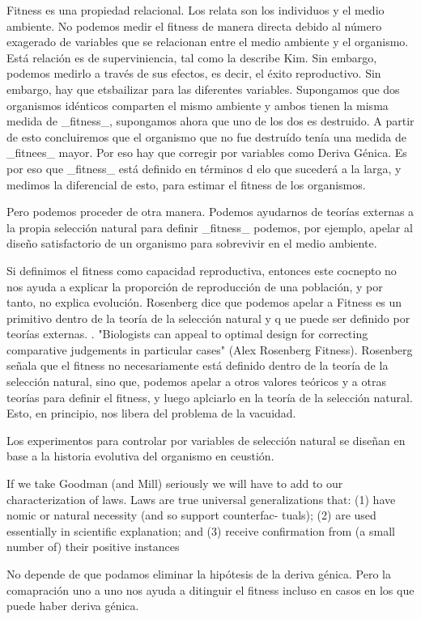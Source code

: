 Fitness es una propiedad relacional. Los relata son los individuos y el medio ambiente. No podemos medir el fitness de manera directa debido al número exagerado de variables que se relacionan entre el medio ambiente y el organismo. Está relación es de superviniencia, tal como la describe Kim. Sin embargo, podemos medirlo a través de sus efectos, es decir, el éxito reproductivo. Sin embargo, hay que etsbailizar para las diferentes variables. Supongamos que dos organismos idénticos comparten el mismo ambiente y ambos tienen la misma medida de _fitness_, supongamos ahora que uno de los dos es destruido. A partir de esto concluiremos que el organismo que no fue destruído tenía una medida de _fitnees_ mayor. Por eso hay que corregir por variables como Deriva Génica. Es por eso que _fitness_ está definido en términos d elo que sucederá a la larga, y medimos la diferencial de esto, para estimar el fitness de los organismos.

Pero podemos proceder de otra manera. Podemos ayudarnos de teorías externas a la propia selección natural para definir _fitness_ podemos, por ejemplo, apelar al diseño satisfactorio de un organismo para sobrevivir en el medio ambiente.

Si definimos el fitness como capacidad reproductiva, entonces este cocnepto no nos ayuda a explicar la proporción de reproducción de una población, y por tanto, no explica evolución. Rosenberg dice que podemos apelar a Fitness es un primitivo dentro de la teoría de la selección natural y q  ue puede ser definido por teorías externas. . "Biologists can appeal to optimal design for correcting comparative judgements in particular cases" (Alex Rosenberg Fitness). Rosenberg señala que el fitness no necesariamente está definido dentro de la teoría de la selección natural, sino que, podemos apelar a otros valores teóricos y a otras teorías para definir el fitness, y luego aplciarlo en la teoría de la selección natural. Esto, en principio, nos libera del problema de la vacuidad.

Los experimentos para controlar por variables de selección natural se diseñan en base a la historia evolutiva del organismo en ceustión.


If we take Goodman (and Mill) seriously we will have to add to our
characterization of laws. Laws are true universal generalizations that:
(1) have nomic or natural necessity (and so support counterfac-
tuals);
(2) are used essentially in scientific explanation; and
(3) receive confirmation from (a small number of) their positive
instances



No depende de que podamos eliminar la hipótesis de la deriva génica. Pero la comapración uno a uno nos ayuda a ditinguir el fitness incluso en casos en los que puede haber deriva génica.
